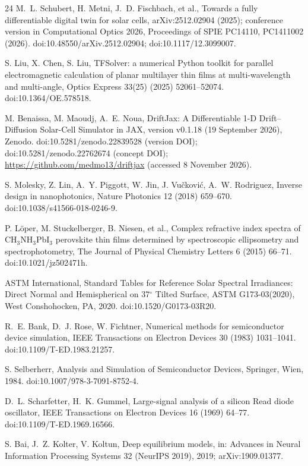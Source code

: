 \documentclass[preprint,12pt]{elsarticle}
\begin{document}
\begin{thebibliography}{24}
 M.~L. Schubert, H. Metni, J.~D. Fischbach, et al.,
Towards a fully differentiable digital twin for solar cells,
arXiv:2512.02904 (2025); conference version in Computational Optics 2026, Proceedings of SPIE PC14110, PC1411002 (2026). doi:10.48550/arXiv.2512.02904; doi:10.1117/12.3099007.

 S. Liu, X. Chen, S. Liu, TFSolver: a numerical Python
toolkit for parallel electromagnetic calculation of planar multilayer thin
films at multi-wavelength and multi-angle, Optics Express 33(25) (2025)
52061--52074. doi:10.1364/OE.578518.

 M. Benaissa, M. Maoudj, A.~E. Noua,
DriftJax: A Differentiable 1-D Drift--Diffusion Solar-Cell Simulator in JAX, version v0.1.18 (19 September 2026), Zenodo.
doi:10.5281/zenodo.22839528 (version DOI); doi:10.5281/zenodo.22762674 (concept DOI);
\url{https://github.com/medmo13/driftjax} (accessed 8 November 2026).

 S. Molesky, Z. Lin, A.~Y. Piggott, W. Jin,
J. Vu\v{c}kovi\'{c}, A.~W. Rodriguez, Inverse design in nanophotonics,
Nature Photonics 12 (2018) 659--670. doi:10.1038/s41566-018-0246-9.

 P. L\"{o}per, M. Stuckelberger, B. Niesen, et al., Complex
refractive index spectra of CH$_3$NH$_3$PbI$_3$ perovskite thin films
determined by spectroscopic ellipsometry and spectrophotometry, The Journal
of Physical Chemistry Letters 6 (2015) 66--71. doi:10.1021/jz502471h.

 ASTM International, Standard Tables for Reference Solar
Spectral Irradiances: Direct Normal and Hemispherical on 37$^{\circ}$ Tilted
Surface, ASTM G173-03(2020), West Conshohocken, PA, 2020.
doi:10.1520/G0173-03R20.

 R.~E. Bank, D.~J. Rose, W. Fichtner, Numerical methods for
semiconductor device simulation, IEEE Transactions on Electron Devices 30
(1983) 1031--1041. doi:10.1109/T-ED.1983.21257.

 S. Selberherr, Analysis and Simulation of
Semiconductor Devices, Springer, Wien, 1984.
doi:10.1007/978-3-7091-8752-4.

 D.~L. Scharfetter, H.~K. Gummel, Large-signal
analysis of a silicon Read diode oscillator, IEEE Transactions on Electron
Devices 16 (1969) 64--77. doi:10.1109/T-ED.1969.16566.

 S. Bai, J.~Z. Kolter, V. Koltun, Deep equilibrium models,
in: Advances in Neural Information Processing Systems 32 (NeurIPS 2019),
2019; arXiv:1909.01377.


\end{thebibliography}
\end{document}
